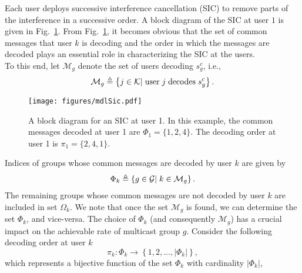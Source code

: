 \documentclass[12pt,draftcls,onecolumn]{IEEEtran}
\theoremstyle{remark}
\theoremstyle{definition}
\begin{document}
Each user deploys successive interference cancellation (SIC) to remove parts of the interference in a successive order. A block diagram of the SIC at user $1$ is given in Fig.~\ref{sic}. From Fig.~\ref{sic}, it becomes obvious that the set of common messages that user $k$ is decoding and the order in which the messages are decoded plays an essential role in characterizing the SIC at the users. \\
To this end, let $\mathcal{M}_g$ denote the set of users decoding $s_g^c$, i.e.,
\begin{equation} \label{eq:e2.12}
\mathcal{M}_g \triangleq \left\lbrace j \in \mathcal{K}| \hspace{1mm}\text{user} \hspace{1mm}j\hspace{1mm}  \text{decodes} \hspace{1mm}s_{g}^c \right\rbrace.
\end{equation}%
\begin{figure}
	\centering
	\texttt{[image: figures/mdlSic.pdf]}
	\caption{A block diagram for an SIC at user 1. In this example, the common messages decoded at user 1 are $\Phi_{1} = \{1, 2, 4\}$. The decoding order at user 1 is $\pi_1 =  \{2, 4 ,1\}$.}
	\label{sic}
\end{figure}%
Indices of groups whose common messages are decoded by user $k$ are given by
\begin{align} \label{eq:e2.13}
\Phi_{k} \triangleq \left\lbrace g \in \mathcal{G}|\hspace{1mm} k \in \mathcal{M}_{g} \right\rbrace.
\end{align}
The remaining groups whose common messages are not decoded by user $k$ are included in set $\Omega_k$.
We note that once the set $\mathcal{M}_g$ is found, we can determine the set $\Phi_{k}$, and vice-versa.
The choice of $\Phi_{k}$ (and consequently $\mathcal{M}_g$) has a crucial impact on the achievable rate of multicast group $g$.
Consider the following decoding order at user $k$
\begin{equation} \label{eq:e2.14}
\pi_{k}:  \Phi_{k} \rightarrow \left\lbrace 1, 2, \ldots,\left|\Phi_{k}\right|  \right\rbrace,
\end{equation}
which represents a bijective function of the set $\Phi_{k}$ with cardinality $\left|\Phi_{k}\right|$,
\end{document}
